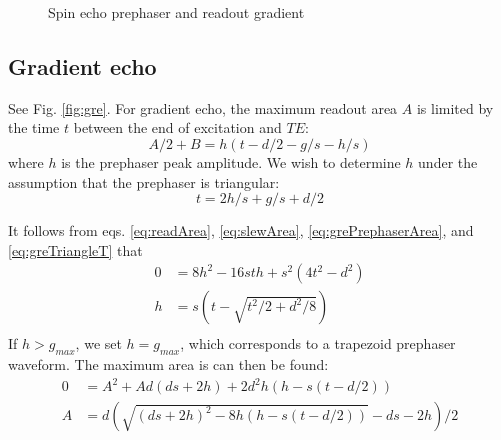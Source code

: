 \documentclass{article}
\begin{document}
\begin{figure}[h]
    \centering
    \caption{Spin echo prephaser and readout gradient}
    \label{fig:se}
\end{figure}

\subsection{Gradient echo}

See Fig. \ref{fig:gre}. 
For gradient echo, the maximum readout area $A$ is limited by the time $t$ between the end of excitation and $TE$:
\begin{equation}
    A/2 + B = h(t-d/2-g/s-h/s)
    \label{eq:grePrephaserArea}
\end{equation}
where $h$ is the prephaser peak amplitude. 
We wish to determine $h$ under the assumption that the prephaser is triangular:
\begin{equation}
    t = 2h/s+g/s+d/2
    \label{eq:greTriangleT}
\end{equation}

It follows from eqs. \ref{eq:readArea}, \ref{eq:slewArea}, \ref{eq:grePrephaserArea}, and \ref{eq:greTriangleT} that
\begin{equation}
    \begin{split}
        0 & = 8h^2 - 16sth + s^2(4t^2-d^2) \\
        h & = s (t - \sqrt{t^2/2+d^2/8}) \\
    \end{split}
    \label{eq:GREprephaserAmp}
\end{equation}
If $h>g_{max}$, we set $h=g_{max}$, which corresponds to a trapezoid prephaser waveform. 
The maximum area is can then be found:
\begin{equation}
    \begin{split}
        0 & = A^2 + Ad(ds+2h) + 2d^2h(h-s(t-d/2)) \\
        A & = d(\sqrt{(ds+2h)^2-8h(h-s(t-d/2))} - ds - 2h)/2
    \end{split}
    \label{eq:greArea}
\end{equation}
\end{document}
